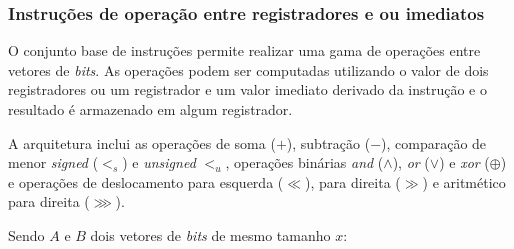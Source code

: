 \subsubsection{Instruções de operação entre registradores e ou imediatos}
\label{ssec:regimm}

    O conjunto base de instruções permite realizar uma gama de operações entre vetores de \emph{bits}. As operações podem ser
    computadas utilizando o valor de dois registradores ou um registrador e um valor imediato derivado da instrução e o resultado
    é armazenado em algum registrador.

    A arquitetura inclui as operações de soma ($+$), subtração ($-$), comparação de menor \emph{signed} ($<_s$) e \emph{unsigned} $<_u$,
    operações binárias \emph{and} ($\land$), \emph{or} ($\lor$) e \emph{xor} ($\oplus$) e operações de deslocamento para esquerda
    ($\ll$), para direita ($\gg$) e aritmético para direita ($\ggg$).

    Sendo $A$ e $B$ dois vetores de \emph{bits} de mesmo tamanho $x$:


